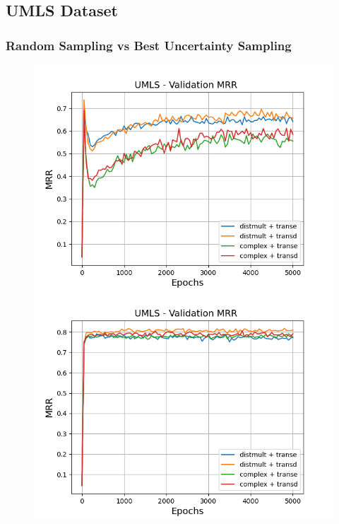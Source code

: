 \subsection{UMLS Dataset}

\subsubsection{Random Sampling vs Best Uncertainty Sampling}


\begin{figure}
    \centering
    \begin{minipage}{.5\textwidth}
      \centering
      \includegraphics[width=0.9\linewidth]{figures/results/gan_train/not_pretrained/random/umls/gan_train_random_umls_mrrs.png}
    \end{minipage}%
    \begin{minipage}{.5\textwidth}
      \centering
      \includegraphics[width=0.9\linewidth]{figures/results/gan_train/not_pretrained/uncertainty/max_distribution/entropy/umls/gan_train_uncertainty_umls_mrrs.png}

\end{minipage}
\end{figure}
